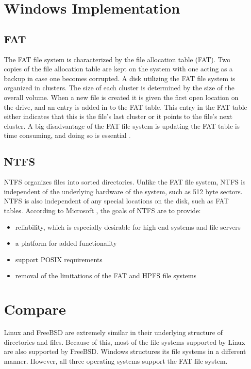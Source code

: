 \documentclass[onecolumn,draftclsnofoot, 10pt, compsoc]{IEEEtran}
\begin{document}
		
\section{Windows Implementation}
	\subsection{FAT}
		The FAT file system is characterized by the file allocation table (FAT).
		Two copies of the file allocation table are kept on the system with one acting as a backup in case one becomes corrupted. 
		A disk utilizing the FAT file system is organized in clusters.
		The size of each cluster is determined by the size of the overall volume. 
		When a new file is created it is given the first open location on the drive, and an entry is added in to the FAT table.
		This entry in the FAT table either indicates that this is the file's last cluster or it points to the file's next cluster.
		A big disadvantage of the FAT file system is updating the FAT table is time consuming, and doing so is essential \cite{windowsFAT}.
	
	\subsection{NTFS}
		NTFS organizes files into sorted directories.
		Unlike the FAT file system, NTFS is independent of the underlying hardware of the system, such as 512 byte sectors. 
		NTFS is also independent of any special locations on the disk, such as FAT tables.
		According to Microsoft \cite{windowsFAT}, the goals of NTFS are to provide:
		\begin{itemize}
			\item{
				reliability, which is especially desirable for high end systems and file servers}
			\item{
				a platform for added functionality}
			\item{
				support POSIX requirements}
			\item{
				removal of the limitations of the FAT and HPFS file systems}
		\end{itemize}

\section{Compare}
	Linux and FreeBSD are extremely similar in their underlying structure of directories and files.
	Because of this, most of the file systems supported by Linux are also supported by FreeBSD.
	Windows structures its file systems in a different manner.
	However, all three operating systems support the FAT file system.
	
	


\end{document}
